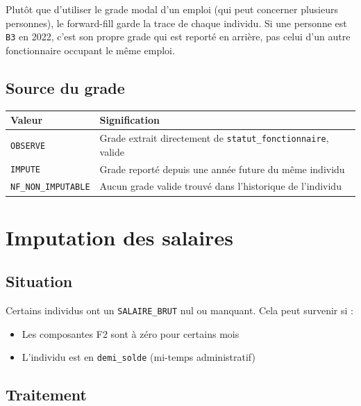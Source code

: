 \documentclass[12pt,a4paper,french]{article}
\newcommand{\colname}[1]{\texttt{#1}}
\begin{document}
\begin{infobox}
    Plutôt que d'utiliser le grade modal d'un emploi (qui peut concerner
    plusieurs personnes), le forward-fill garde la trace de chaque individu.
    Si une personne est \texttt{B3} en 2022, c'est son propre grade qui est
    reporté en arrière, pas celui d'un autre fonctionnaire occupant le même
    emploi.
\end{infobox}

\subsection{Source du grade}

\begin{tabularx}{\textwidth}{lX}
    \toprule
    \textbf{Valeur} & \textbf{Signification} \\
    \midrule
    \texttt{OBSERVE} & Grade extrait directement de \colname{statut\_fonctionnaire},
                       valide \\
    \texttt{IMPUTE} & Grade reporté depuis une année future du même individu \\
    \texttt{NF\_NON\_IMPUTABLE} & Aucun grade valide trouvé dans l'historique
                       de l'individu \\
    \bottomrule
\end{tabularx}

\section{Imputation des salaires}

\subsection{Situation}

Certains individus ont un \colname{SALAIRE\_BRUT} nul ou manquant.
Cela peut survenir si :

\begin{itemize}
    \item Les composantes F2 sont à zéro pour certains mois
    \item L'individu est en \texttt{demi\_solde} (mi-temps administratif)
\end{itemize}

\subsection{Traitement}
\end{document}
